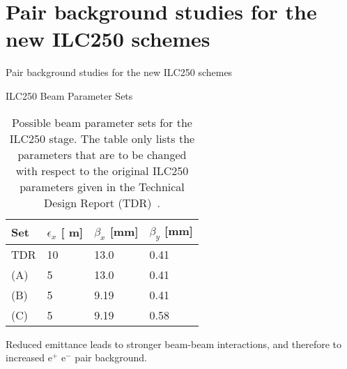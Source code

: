 \documentclass[xcolor={dvipsnames}]{beamer}
\newcommand{\electron}{e$^-$\xspace}
\newcommand{\positron}{e$^+$\xspace}
\newcommand{\murm}{%
  \ifmmode
    \mathchoice
        {\hbox{\normalsize\textmu}}
        {\hbox{\normalsize\textmu}}
        {\hbox{\scriptsize\textmu}}
        {\hbox{\tiny\textmu}}%
  \else
    \textmu
  \fi
}
\begin{document}

\section{Pair background studies for the new ILC250 schemes}
\begin{frame}
 \centering \LARGE Pair background studies for the new ILC250 schemes
\end{frame}

\begin{frame}{ILC250 Beam Parameter Sets}
 \begin{table}
\caption{Possible beam parameter sets for the ILC250 stage. The table only lists the parameters that are to be changed with respect to the original ILC250 parameters given in the Technical Design Report (TDR)~\cite[p. 11]{TDR1}.}
\label{tab:Parameters}
\centering
\begin{tabularx}{0.55\textwidth}{llll}
\hline\hline
\textbf{Set}  & \textbf{$\epsilon_x$ [\murm m]} & \textbf{$\beta_x$ [mm]} & \textbf{$\beta_y$ [mm]}\\
\hline
\cline{1-4}
\hline
 TDR & 10 & 13.0 & 0.41\\
 (A) & 5 & 13.0 & 0.41\\
 (B) & 5 & 9.19 & 0.41\\
 (C) & 5 & 9.19 & 0.58\\
\hline\hline
\end{tabularx}
\end{table}
Reduced emittance leads to stronger beam-beam interactions, and therefore to increased \positron \electron pair background.
\end{frame}
\end{document}
